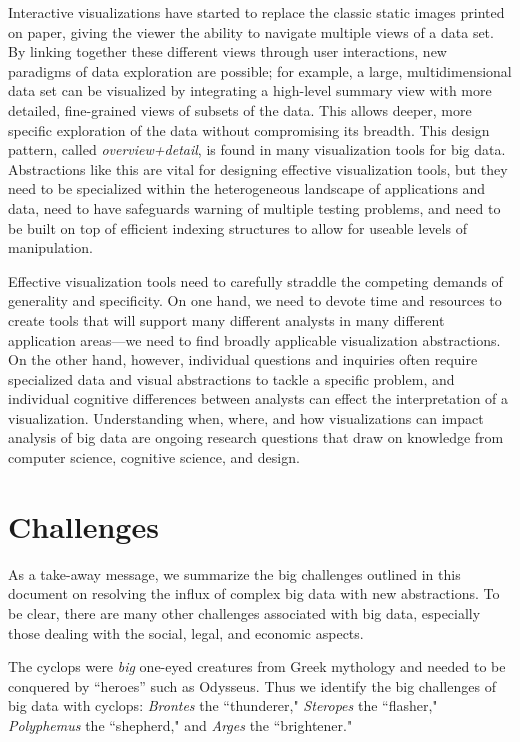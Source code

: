 \documentclass{article}
\begin{document}
Interactive visualizations have started to replace the classic static images printed on paper, giving the viewer the ability to navigate multiple views of a data set. By linking together these different views through user interactions, new paradigms of data exploration are possible; for example, a large, multidimensional data set can be visualized by integrating a high-level summary view with more detailed, fine-grained views of subsets of the data. This allows deeper, more specific exploration of the data without compromising its breadth. This design pattern, called \emph{overview+detail}, is found in many visualization tools for big data.  Abstractions like this are vital for designing effective visualization tools, but they need to be specialized within the heterogeneous landscape of applications and data, need to have safeguards warning of multiple testing problems, and need to be built on top of efficient indexing structures to allow for useable levels of manipulation.

Effective visualization tools need to carefully straddle the competing demands of generality and specificity. On one hand, we need to devote time and resources to create tools that will support many different analysts in many different application areas---we need to find broadly applicable visualization abstractions. On the other hand, however, individual questions and inquiries often require specialized data and visual abstractions to tackle a specific problem, and individual cognitive differences between analysts can effect the interpretation of a visualization. Understanding when, where, and how visualizations can impact analysis of big data are ongoing research questions that draw on knowledge from computer science, cognitive science, and design.





\section*{Challenges}

As a take-away message, we summarize the big challenges outlined in this document on resolving the influx of complex big data with new abstractions.  To be clear, there are many other challenges associated with big data, especially those dealing with the social, legal, and economic aspects. 

The cyclops were \emph{big} one-eyed creatures from Greek mythology and needed to be conquered by ``heroes'' such as Odysseus.  Thus we identify the big challenges of big data  with cyclops: 
\emph{Brontes} the ``thunderer," \emph{Steropes} the ``flasher," \emph{Polyphemus} the ``shepherd," and \emph{Arges} the ``brightener."
\end{document}
